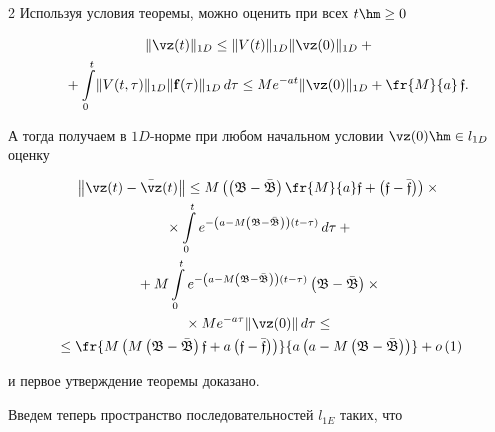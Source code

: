 \begin{multicols}{2}
Используя условия теоремы, можно оценить при всех $ t \hm\ge 0$

\begin{multline*}

 \|\vz (t)\|_{1D} \le  \|V(t)\|_{1D}\|\vz (0)\|_{1D} + {}\\

{} + \int\limits_0^t\! \|V(t, \tau)\|_{1D}\|{\bf f}(\tau)\|_{1D} \, d\tau      \le

 Me^{-at}\|\vz (0)\|_{1D} + \fr{M}{a}\,  \mathfrak{f}.\hspace*{-9.4267pt}


\end{multline*}

А тогда получаем в $1D$-нор\-ме при любом начальном условии  $\vz (0) \hm\in l_{1D}$ оценку

\begin{multline}

\left\|\vz(t)-\bar{\vz}(t)\right\| \le

 M\left(\left(\mathfrak{B-\bar{B}}\right)\fr{M}{a}  \mathfrak{f}  + 

 \left(\mathfrak{f-\bar{f}}\right)\right) \times{}\\

 {}\times

\int\limits_0^t e^{-\left(a - M\left(\mathfrak{B-\bar{B}}\right)\right)(t-\tau)}\, d\tau +{} \\

{} + M \int\limits_0^t e^{-\left(a - M\left(\mathfrak{B-\bar{B}}\right)\right)(t-\tau)}

\left(\mathfrak{B-\bar{B}}\right)\times{}\\

{}\times  Me^{-a\tau}\|\vz (0)\| \, d\tau \le {}\\

 {}\le \fr{M\left(M\left(\mathfrak{B-\bar{B}}\right) \mathfrak{f}  + a\left(\mathfrak{f-\bar{f}}\right)\right)}{a\left(a - M\left(\mathfrak{B-\bar{B}}\right)\right)} + o\left( 1 \right) 

  \label{aaa-a}

\end{multline}

и первое утверждение теоремы доказано.



\smallskip



Введем теперь пространство последовательностей $l_{1E}$ таких, что


\end{multicols}
